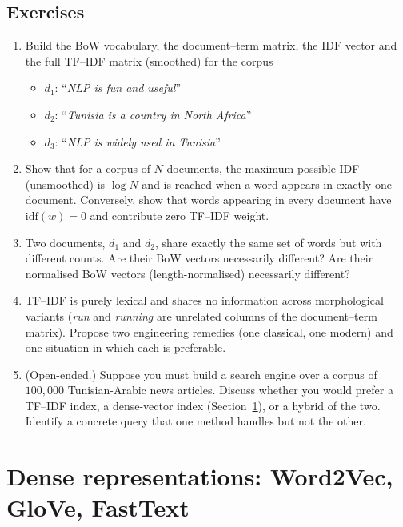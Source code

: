 \documentclass[12pt,a4paper]{report}
\theoremstyle{definition}
\theoremstyle{remark}
\begin{document}
\subsection{Exercises}
\begin{enumerate}
    \item Build the BoW vocabulary, the document--term matrix, the IDF vector and the full TF--IDF matrix (smoothed) for the corpus
    \begin{itemize}
        \item $d_1$: ``\emph{NLP is fun and useful}''
        \item $d_2$: ``\emph{Tunisia is a country in North Africa}''
        \item $d_3$: ``\emph{NLP is widely used in Tunisia}''
    \end{itemize}
    \item Show that for a corpus of $N$ documents, the maximum possible IDF (unsmoothed) is $\log N$ and is reached when a word appears in exactly one document. Conversely, show that words appearing in every document have $\mathrm{idf}(w) = 0$ and contribute zero TF--IDF weight.
    \item Two documents, $d_1$ and $d_2$, share exactly the same set of words but with different counts. Are their BoW vectors necessarily different? Are their normalised BoW vectors (length-normalised) necessarily different?
    \item TF--IDF is purely lexical and shares no information across morphological variants (\emph{run} and \emph{running} are unrelated columns of the document--term matrix). Propose two engineering remedies (one classical, one modern) and one situation in which each is preferable.
    \item (Open-ended.) Suppose you must build a search engine over a corpus of $100{,}000$ Tunisian-Arabic news articles. Discuss whether you would prefer a TF--IDF index, a dense-vector index (Section~\ref{sec:dense}), or a hybrid of the two. Identify a concrete query that one method handles but not the other.
\end{enumerate}

\section{Dense representations: Word2Vec, GloVe, FastText}
\label{sec:dense}
\end{document}
